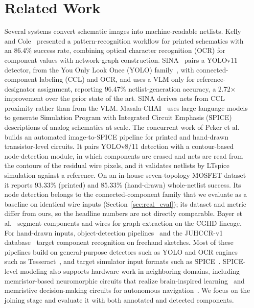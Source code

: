\documentclass{ieeeaccess}
\begin{document}
\section{Related Work}
\label{sec:related}

Several systems convert schematic images into machine-readable netlists. Kelly and Cole~\cite{kelly2024digitizing} presented a pattern-recognition workflow for printed schematics with an 86.4\% success rate, combining optical character recognition (OCR) for component values with network-graph construction. SINA~\cite{sina2026} pairs a YOLOv11 detector, from the You Only Look Once (YOLO) family~\cite{redmon2016yolo,jocher2023yolo}, with connected-component labeling (CCL) and OCR, and uses a VLM only for reference-designator assignment, reporting 96.47\% netlist-generation accuracy, a 2.72$\times$ improvement over the prior state of the art. SINA derives nets from CCL proximity rather than from the VLM. Masala-CHAI~\cite{masalachai2024} uses large language models to generate Simulation Program with Integrated Circuit Emphasis (SPICE) descriptions of analog schematics at scale. The concurrent work of Peker et al.~\cite{peker2026} builds an automated image-to-SPICE pipeline for printed and hand-drawn transistor-level circuits. It pairs YOLOv8/11 detection with a contour-based node-detection module, in which components are erased and nets are read from the contours of the residual wire pixels, and it validates netlists by LTspice simulation against a reference. On an in-house seven-topology MOSFET dataset it reports 93.33\% (printed) and 85.33\% (hand-drawn) whole-netlist success. Its node detection belongs to the connected-component family that we evaluate as a baseline on identical wire inputs (Section~\ref{sec:real_eval}); its dataset and metric differ from ours, so the headline numbers are not directly comparable. Bayer et al.~\cite{instanceseg2023} segment components and wires for graph extraction on the CGHD lineage. For hand-drawn inputs, object-detection pipelines~\cite{handdrawn2021} and the JUHCCR-v1 database~\cite{juhccr2025} target component recognition on freehand sketches. Most of these pipelines build on general-purpose detectors such as YOLO and OCR engines such as Tesseract~\cite{smith2007tesseract}, and target simulator input formats such as SPICE~\cite{nagel1973spice}. SPICE-level modeling also supports hardware work in neighboring domains, including memristor-based neuromorphic circuits that realize brain-inspired learning~\cite{gao2026memristor} and memristive decision-making circuits for autonomous navigation~\cite{gao2026memristive}. We focus on the joining stage and evaluate it with both annotated and detected components.
\end{document}
